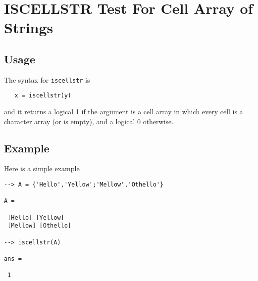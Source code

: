 \section{ISCELLSTR Test For Cell Array of Strings}

\subsection{Usage}

The syntax for \verb|iscellstr| is 
\begin{verbatim}
   x = iscellstr(y)
\end{verbatim}
and it returns a logical 1 if the argument is a cell array
in which every cell is a character array (or is empty), and
a logical 0 otherwise.
\subsection{Example}

Here is a simple example
\begin{verbatim}
--> A = {'Hello','Yellow';'Mellow','Othello'}

A = 

 [Hello] [Yellow] 
 [Mellow] [Othello] 

--> iscellstr(A)

ans = 

 1 
\end{verbatim}
